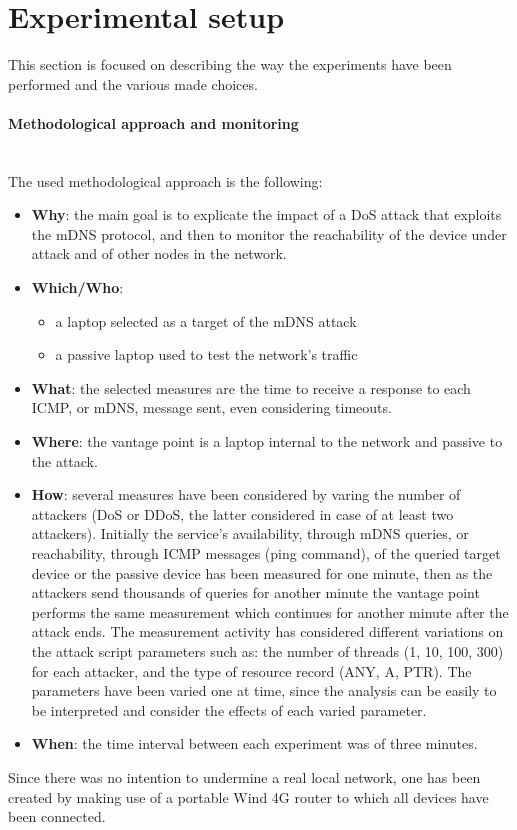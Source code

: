 \documentclass[fleqn, 11pt]{SelfArx} %
\begin{document}
\section{Experimental setup}
This section is focused on describing the way the experiments have been performed and the various made choices.

\paragraph{Methodological approach and monitoring}\mbox{}\\
The used methodological approach is the following:
\begin{itemize}[leftmargin=*]
	\item \textbf{Why}: the main goal is to explicate the impact of a DoS attack that exploits the mDNS protocol, and then to monitor the reachability of the device under attack and of other nodes in the network.
	\item \textbf{Which/Who}:
\begin{itemize}[leftmargin=*, noitemsep, topsep=0pt]
    \item a laptop selected as a target of the mDNS attack
    \item a passive laptop used to test the network's traffic
\end{itemize}
	\item \textbf{What}: the selected measures are the time to receive a response to each ICMP, or mDNS, message sent, even considering timeouts.
	\item \textbf{Where}: the vantage point is a laptop internal to the network and passive to the attack.
	\item \textbf{How}: several measures have been considered by varing the number of attackers (DoS or DDoS, the latter considered in case of at least two attackers). Initially the service's availability, through mDNS queries, or reachability, through ICMP messages (ping command), of the queried target device or the passive device has been measured for one minute, then as the attackers send thousands of queries for another minute the vantage point performs the same measurement which continues for another minute after the attack ends. \newline
The measurement activity has considered different variations on the attack script parameters such as: the number of threads (1, 10, 100, 300) for each attacker, and the type of resource record (ANY, A, PTR). The parameters have been varied one at time, since the analysis can be easily to be interpreted and consider the effects of each varied parameter.
\item \textbf{When}: the time interval between each experiment was of three minutes.
\end{itemize}
Since there was no intention to undermine a real local network, one has been created by making use of a portable Wind 4G router \cite{RouterSpecs} to which all devices have been connected.
\end{document}
